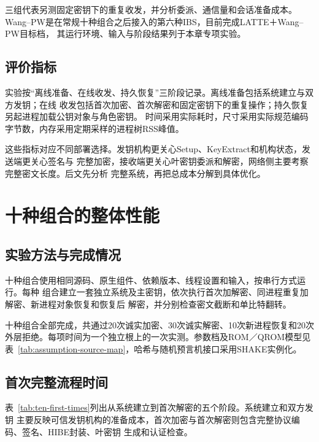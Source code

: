 三组代表另测固定密钥下的重复收发，并分析委派、通信量和会话准备成本。Wang--PW是在常规十种组合之后接入的第六种IBS，目前完成LATTE＋Wang--PW目标档，
其运行环境、输入与阶段结果列于本章专项实验。

\subsection{评价指标}

实验按“离线准备、在线收发、持久恢复”三阶段记录。离线准备包括系统建立与双方发钥；在线
收发包括首次加密、首次解密和固定密钥下的重复操作；持久恢复另起进程加载公钥对象与角色密钥。
时间采用实际耗时，尺寸采用实际规范编码字节数，内存采用定期采样的进程树RSS峰值。

这些指标对应不同部署选择。发钥机构更关心Setup、KeyExtract和机构状态，发送端更关心签名与
完整加密，接收端更关心叶密钥委派和解密，网络侧主要考察完整密文长度。后文先分析
完整系统，再把总成本分解到具体优化。

\section{十种组合的整体性能}

\subsection{实验方法与完成情况}

十种组合使用相同源码、原生组件、依赖版本、线程设置和输入，按串行方式运行。每种
组合建立一套独立系统及主密钥，依次执行首次加解密、同进程重复加解密、新进程对象恢复和恢复后
解密，并分别检查密文截断和单比特翻转。

十种组合全部完成，共通过20次诚实加密、30次诚实解密、10次新进程恢复和20次外层拒绝。每项时间为一个独立根上的一次实测。参数档及ROM／QROM模型见表~\ref{tab:assumption-source-map}，哈希与随机预言机接口采用SHAKE实例化。

\subsection{首次完整流程时间}

表~\ref{tab:ten-first-times}列出从系统建立到首次解密的五个阶段。系统建立和双方发钥
主要反映可信发钥机构的准备成本，首次加密与首次解密则包含完整协议编码、签名、HIBE封装、叶密钥
生成和认证检查。


